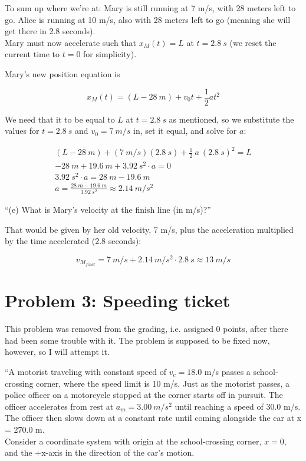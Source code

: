\documentclass[8.01x]{subfiles}
\begin{document}
To sum up where we're at: Mary is still running at 7 m/s, with 28 meters left to go. Alice is running at 10 m/s, also with 28 meters left to go (meaning she will get there in 2.8 seconds).\\
Mary must now accelerate such that $x_M(t) = L$ at $t = \SI{2.8}{s}$ (we reset the current time to $t=0$ for simplicity).

Mary's new position equation is

\begin{equation}
x_M(t) = (L - \SI{28}{m}) + v_0 t + \frac{1}{2} a t^2
\end{equation}

We need that it to be equal to $L$ at $t = \SI{2.8}{s}$ as mentioned, so we substitute the values for $t = \SI{2.8}{s}$ and $v_0 = \SI{7}{m/s}$ in, set it equal, and solve for $a$:

\begin{align}
(L - \SI{28}{m}) + (\SI{7}{m/s})(\SI{2.8}{s}) + \frac{1}{2}\ a\ (\SI{2.8}{s})^2 = L\\
- \SI{28}{m} + \SI{19.6}{m} + \SI{3.92}{s^2} \cdot a = 0\\
\SI{3.92}{s^2} \cdot a = \SI{28}{m} - \SI{19.6}{m}\\
a = \frac{\SI{28}{m} - \SI{19.6}{m}}{\SI{3.92}{s^2}} \approx \SI{2.14}{m/s^2}
\end{align}

``(e) What is Mary's velocity at the finish line (in m/s)?''

That would be given by her old velocity, 7 m/s, plus the acceleration multiplied by the time accelerated (2.8 seconds):

\begin{equation}
v_{M_{final}} = \SI{7}{m/s} + \SI{2.14}{m/s^2} \cdot \SI{2.8}{s} \approx \SI{13}{m/s}
\end{equation}

\section{Problem 3: Speeding ticket}

This problem was removed from the grading, i.e. assigned 0 points, after there had been some trouble with it. The problem is supposed to be fixed now, however, so I will attempt it.

``A motorist traveling with constant speed of $v_c = 18.0$ m/s passes a school-crossing corner, where the speed limit is 10 m/s. Just as the motorist passes, a police officer on a motorcycle stopped at the corner starts off in pursuit. The officer accelerates from rest at $a_m = \SI{3.00}{m/s^2}$ until reaching a speed of 30.0 m/s. The officer then slows down at a constant rate until coming alongside the car at x = 270.0 m.\\
Consider a coordinate system with origin at the school-crossing corner, $x = 0$, and the +x-axis in the direction of the car's motion.
\end{document}
